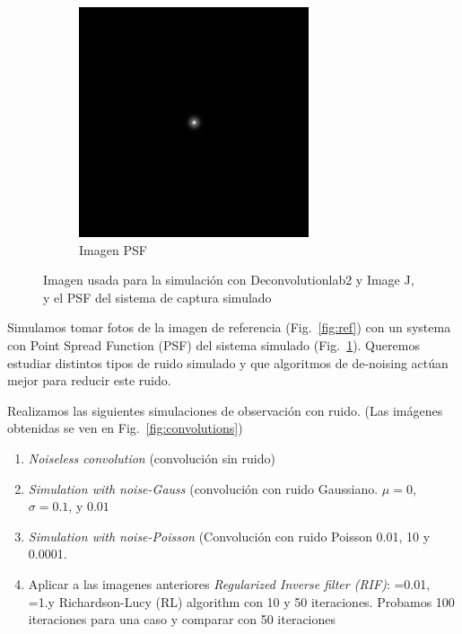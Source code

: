 \documentclass{./packages/optica-article}
\begin{document}
\begin{figure}[hbp]
\begin{subfigure}[t]{0.45\textwidth}
		\includegraphics[width=\textwidth]{Simulation deconvolution/psf.jpg}
		\caption{Imagen PSF}\label{fig:psf}
	\end{subfigure}
	\caption{Imagen usada para la simulación con Deconvolutionlab2 y Image J, y el PSF del sistema de captura simulado}\label{fig:image:ref-psf}
\end{figure}
 
 Simulamos tomar fotos de la imagen de referencia (Fig.~\ref{fig:ref}) con un systema con Point Spread Function (PSF) del sistema simulado (Fig.~\ref{fig:psf}). Queremos estudiar distintos tipos de ruido simulado y que algoritmos de de-noising actúan mejor para reducir este ruido.

 Realizamos las siguientes simulaciones de observación con ruido. (Las imágenes obtenidas se ven en Fig.~\ref{fig:convolutions})

\begin{enumerate}
    \item \emph{Noiseless convolution} (convolución sin ruido)
    \item \emph{Simulation with noise-Gauss} (convolución con ruido Gaussiano. $\mu=0$, $\sigma=0.1$, y $0.01$
    \item \emph{Simulation with noise-Poisson} (Convolución con ruido Poisson 0.01, 10 y 0.0001.
    \item Aplicar a las imagenes anteriores \emph{Regularized Inverse filter (RIF)}: =0.01, =1.y Richardson-Lucy (RL) algorithm con 10 y 50 iteraciones. Probamos 100 iteraciones para una caso y comparar con 50 iteraciones
\end{enumerate}
\end{document}
